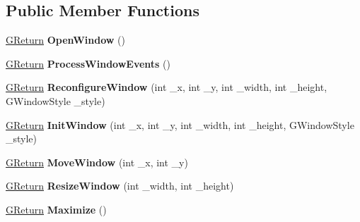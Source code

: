 \subsection*{Public Member Functions}
\begin{DoxyCompactItemize}
\item 
\hyperlink{namespaceGW_a67a839e3df7ea8a5c5686613a7a3de21}{G\+Return} {\bfseries Open\+Window} ()\hypertarget{classAppWindow_afb6034c67df3311832330de78ffb8363}{}\label{classAppWindow_afb6034c67df3311832330de78ffb8363}

\item 
\hyperlink{namespaceGW_a67a839e3df7ea8a5c5686613a7a3de21}{G\+Return} {\bfseries Process\+Window\+Events} ()\hypertarget{classAppWindow_a57bde2d7a148bbf7bfac8f21a7289ad4}{}\label{classAppWindow_a57bde2d7a148bbf7bfac8f21a7289ad4}

\item 
\hyperlink{namespaceGW_a67a839e3df7ea8a5c5686613a7a3de21}{G\+Return} {\bfseries Reconfigure\+Window} (int \+\_\+x, int \+\_\+y, int \+\_\+width, int \+\_\+height, G\+Window\+Style \+\_\+style)\hypertarget{classAppWindow_a16cadf1d2734d0e773ffdb2a40f263c5}{}\label{classAppWindow_a16cadf1d2734d0e773ffdb2a40f263c5}

\item 
\hyperlink{namespaceGW_a67a839e3df7ea8a5c5686613a7a3de21}{G\+Return} {\bfseries Init\+Window} (int \+\_\+x, int \+\_\+y, int \+\_\+width, int \+\_\+height, G\+Window\+Style \+\_\+style)\hypertarget{classAppWindow_a202f299c1f405d2fcbcc3ebd27b2b94f}{}\label{classAppWindow_a202f299c1f405d2fcbcc3ebd27b2b94f}

\item 
\hyperlink{namespaceGW_a67a839e3df7ea8a5c5686613a7a3de21}{G\+Return} {\bfseries Move\+Window} (int \+\_\+x, int \+\_\+y)\hypertarget{classAppWindow_adfc662614922cb2f81a837a0a272b4d6}{}\label{classAppWindow_adfc662614922cb2f81a837a0a272b4d6}

\item 
\hyperlink{namespaceGW_a67a839e3df7ea8a5c5686613a7a3de21}{G\+Return} {\bfseries Resize\+Window} (int \+\_\+width, int \+\_\+height)\hypertarget{classAppWindow_a4729069f577608a88a220491f3fe915b}{}\label{classAppWindow_a4729069f577608a88a220491f3fe915b}

\item 
\hyperlink{namespaceGW_a67a839e3df7ea8a5c5686613a7a3de21}{G\+Return} {\bfseries Maximize} ()\hypertarget{classAppWindow_a441624e699140c4fa7545a9235a7d518}{}\label{classAppWindow_a441624e699140c4fa7545a9235a7d518}


\end{DoxyCompactItemize}
